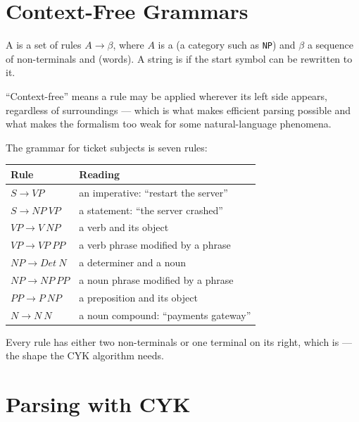 \section{Context-Free Grammars}

\begin{definitionbox}
A  is a set of rules $A \to \beta$, where $A$ is a
 (a category such as \texttt{NP}) and $\beta$ a sequence of
non-terminals and  (words). A string is  if
the start symbol can be rewritten to it.

``Context-free'' means a rule may be applied wherever its left side appears,
regardless of surroundings --- which is what makes efficient parsing possible and
what makes the formalism too weak for some natural-language phenomena.
\end{definitionbox}

The grammar for ticket subjects is seven rules:

\smallskip
\noindent\begin{tabular}{@{}L{5.2cm}L{9.6cm}@{}}
\toprule
\textbf{Rule} & \textbf{Reading} \\
\midrule
$S \to \mathit{VP}$ & an imperative: ``restart the server'' \\
$S \to \mathit{NP}\ \mathit{VP}$ & a statement: ``the server crashed'' \\
$\mathit{VP} \to V\ \mathit{NP}$ & a verb and its object \\
$\mathit{VP} \to \mathit{VP}\ \mathit{PP}$ & a verb phrase modified by a
phrase \\
$\mathit{NP} \to \mathit{Det}\ N$ & a determiner and a noun \\
$\mathit{NP} \to \mathit{NP}\ \mathit{PP}$ & a noun phrase modified by a
phrase \\
$\mathit{PP} \to P\ \mathit{NP}$ & a preposition and its object \\
$N \to N\ N$ & a noun compound: ``payments gateway'' \\
\bottomrule
\end{tabular}

\smallskip
Every rule has either two non-terminals or one terminal on its right, which is
 --- the shape the CYK algorithm needs.

\section{Parsing with CYK}

